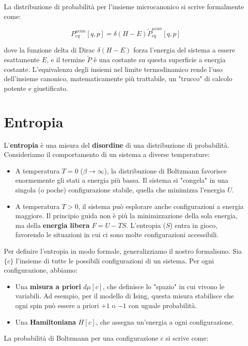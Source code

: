 La distribuzione di probabilità per l'insieme microcanonico si scrive formalmente come:

\begin{equation}
    P_{eq}^{\mu can}[q,p] = \delta(H-E) \tilde{P}_{eq}^{\mu can}[q,p]
\end{equation}


dove la funzione delta di Dirac $\delta(H-E)$ forza l'energia del sistema a essere esattamente $E$, e il termine $\tilde{P}$ è una costante su questa superficie a energia costante.
L'equivalenza degli insiemi nel limite termodinamico rende l'uso dell'insieme canonico, matematicamente più trattabile, un "trucco" di calcolo potente e giustificato.

\section{Entropia}

L'\textbf{entropia} è una misura del \textbf{disordine} di una distribuzione di probabilità.
Consideriamo il comportamento di un sistema a diverse temperature:
\begin{itemize}
    \item A temperatura $T=0$ ($ \beta \to \infty $), la distribuzione di Boltzmann favorisce enormemente gli stati a energia più bassa. Il sistema si "congela" in una singola (o poche) configurazione stabile, quella che minimizza l'energia $U$.
    \item A temperatura $T > 0$, il sistema può esplorare anche configurazioni a energia maggiore. Il principio guida non è più la minimizzazione della sola energia, ma della \textbf{energia libera} $F = U - TS$. L'entropia ($S$) entra in gioco, favorendo le situazioni in cui ci sono molte configurazioni accessibili.
\end{itemize}

Per definire l'entropia in modo formale, generalizziamo il nostro formalismo. Sia $\{c\}$ l'insieme di tutte le possibili configurazioni di un sistema. Per ogni configurazione, abbiamo:
\begin{itemize}
    \item Una \textbf{misura a priori} $d\mu[c]$, che definisce lo "spazio" in cui vivono le variabili. Ad esempio, per il modello di Ising, questa misura stabilisce che ogni spin può essere a priori $+1$ o $-1$ con uguale probabilità.
    \item Una \textbf{Hamiltoniana} $H[c]$, che assegna un'energia a ogni configurazione.
\end{itemize}
La probabilità di Boltzmann per una configurazione $c$ si scrive come:

